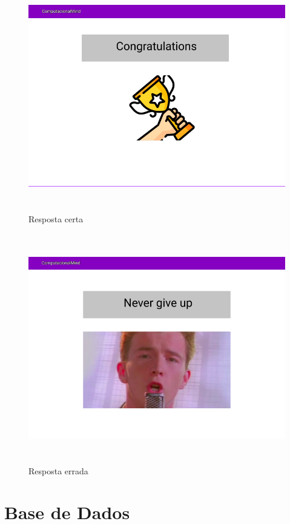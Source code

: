 \documentclass[11pt,a4paper]{report}
\begin{document}
\begin{figure}[H]
\centering
\includegraphics[width = 14cm,height = 10cm]{MockUserCongratulations.png}
\caption{Resposta certa}
\label{fig:MockUserCongratulations}
\end{figure}

\begin{figure}[H]
\centering
\includegraphics[width = 14cm,height = 10cm]{MockUserTryAgain.png}
\caption{Resposta errada}
\label{fig:MockUserTryAgain}
\end{figure}


\chapter{Base de Dados}
\end{document}
